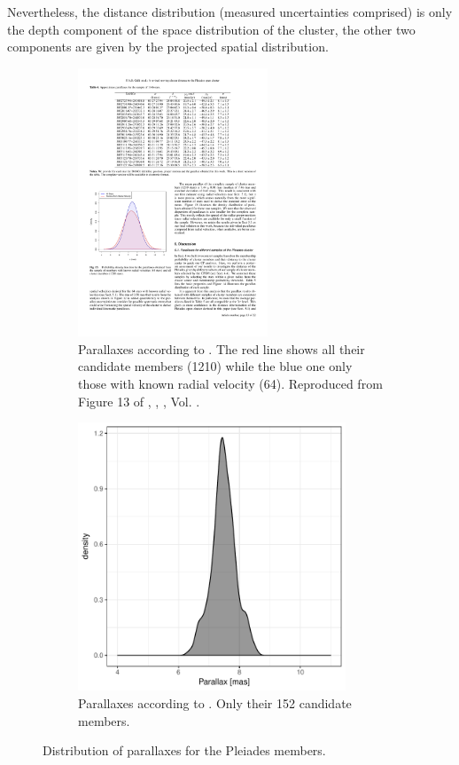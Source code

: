 Nevertheless, the distance distribution {(measured uncertainties comprised)} is only the depth component of the space distribution of the cluster, the other two components are given by the projected spatial distribution. 

\begin{figure}[ht!]
    \centering
    \begin{subfigure}[t]{\textwidth}
    \centering
        \includegraphics[height=8cm]{background/Figures/F13_Galli2017.pdf}
        \caption{Parallaxes according to \citet{Galli2017}. The red line shows all their candidate members (1210) while the blue one only those with known radial velocity (64). Reproduced from Figure 13 of \citet{Galli2017}, \textit{}, , Vol. .}
        \label{fig:parallaxPhillip}
    \end{subfigure}
    \begin{subfigure}[t]{\textwidth}
    \centering
       \includegraphics[height=8cm]{background/Figures/Parallax_GaiaCol2017.pdf}
        \caption{Parallaxes according to \citet{2017A&A...601A..19G}. Only their 152 candidate members.}
        \label{fig:parallaxTGAS} 
    \end{subfigure}
    \caption{Distribution of parallaxes for the Pleiades members.}
\end{figure}



